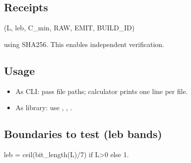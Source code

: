 \documentclass[letterpaper,10pt,english]{sphinxmanual}
\begin{document}
\subsection{Receipts}
\label{\detokenize{clf_calculator:receipts}}\begin{description}
\sphinxAtStartPar
(L, leb, C\_min, RAW, EMIT, BUILD\_ID)

\end{description}

\sphinxAtStartPar
using SHA\sphinxhyphen{}256. This enables independent verification.


\subsection{Usage}
\label{\detokenize{clf_calculator:usage}}\begin{itemize}
\item {} 
\sphinxAtStartPar
As CLI: pass file paths; calculator prints one line per file.

\item {} 
\sphinxAtStartPar
As library: use , , .

\end{itemize}


\subsection{Boundaries to test (leb bands)}
\label{\detokenize{clf_calculator:boundaries-to-test-leb-bands}}\begin{description}
\sphinxAtStartPar
leb = ceil(bit\_length(L)/7) if L\textgreater{}0 else 1.

\end{description}
\end{document}
